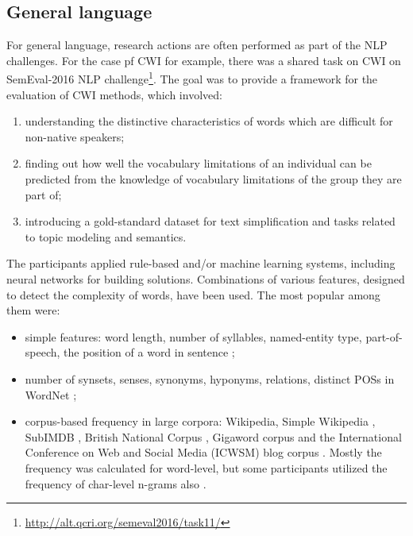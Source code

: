 \subsection{General language}
\label{sec:general-lang}
For general language, research actions are often performed as part of the NLP challenges. For the case pf CWI for example, there was a shared task on CWI on SemEval-2016 NLP challenge\footnote{\url{http://alt.qcri.org/semeval2016/task11/}}. The goal was to provide a framework for the evaluation of CWI methods, which involved:
\begin{enumerate}
    \item understanding the distinctive characteristics of words which are difficult for non-native speakers;
    \item finding out how well the vocabulary limitations of an individual can be predicted from the knowledge of vocabulary limitations of the group they are part of;
    \item introducing a gold-standard dataset for text simplification and tasks related to topic modeling and semantics.
\end{enumerate}

The participants applied rule-based and/or
machine learning systems, including neural networks for building solutions.
Combinations of various features, designed
to detect the complexity of words, have been used. The most popular among them were: 

\begin{itemize}
    \item simple features: word length, number of syllables, named-entity type, part-of-speech, the position of a word in sentence \citep{Bingel-SemEval2016};
    
    \item number of synsets, senses, synonyms, hyponyms, relations, distinct POSs in WordNet \citep{Ronzano-SemEval2016};
    
    \item corpus-based frequency in large corpora: Wikipedia, Simple Wikipedia \citep{Kauchak-2013}, SubIMDB \citep{Paetzold-SemEval2016solution}, British National Corpus \citep{Ronzano-SemEval2016}, Gigaword corpus and the International Conference on Web and Social Media (ICWSM) blog corpus \citep{Brooke-SemEval2016}. Mostly the frequency was calculated for word-level, but some participants utilized the frequency of char-level n-grams also \citep{Bingel-SemEval2016}.
\end{itemize}

